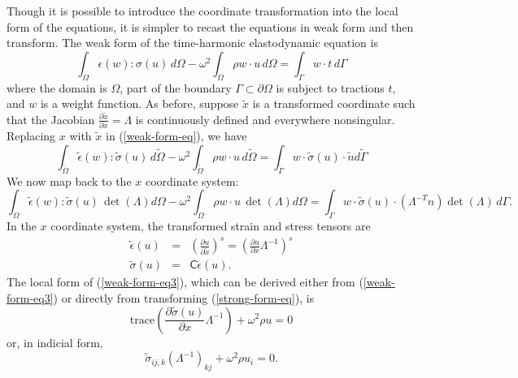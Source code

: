 \documentclass{article}
\newcommand{\trace}{\mathrm{trace}}
\newcommand{\sfC}{\mathsf{C}}
\newcommand{\Lambdaip}{\left( \Lambda^{-1} \right)}
\begin{document}
Though it is possible to introduce the coordinate transformation into
the local form of the equations, it is simpler to recast the equations
in weak form and then transform.  The weak form of the time-harmonic
elastodynamic equation is
\begin{equation}
  \int_\Omega \epsilon(w) : \sigma(u) \, d\Omega -
  \omega^2 \int_\Omega \rho w \cdot u \, d\Omega =
  \int_{\Gamma} w \cdot t \, d\Gamma 
  \label{weak-form-eq}
\end{equation}
where the domain is $\Omega$, part of the boundary $\Gamma \subset
\partial \Omega$ is subject to tractions $t$, and $w$ is a weight
function.  As before, suppose $\tilde{x}$ is a transformed coordinate
such that the Jacobian $\frac{\partial \tilde{x}}{\partial x} =
\Lambda$ is continuously defined and everywhere nonsingular.
Replacing $x$ with $\tilde{x}$ in (\ref{weak-form-eq}), we have
\begin{equation}
  \int_{\tilde{\Omega}}
    \tilde{\epsilon}(w) : \tilde{\sigma}(u) \, d\tilde{\Omega} -
  \omega^2 \int_{\tilde{\Omega}} \rho w \cdot u \, d\tilde{\Omega} =
  \int_{\tilde{\Gamma}} 
    w \cdot \tilde{\sigma}(u) \cdot \tilde{n} d\tilde{\Gamma}
  \label{weak-form-eq2}
\end{equation}
We now map back to the $x$ coordinate system:
\begin{equation}
  \int_{\Omega} 
    \tilde{\epsilon}(w) : \tilde{\sigma}(u) \, \det(\Lambda) d\Omega -
  \omega^2 \int_\Omega \rho w \cdot u \, \det(\Lambda) d\Omega =
  \int_{\Gamma}
    w \cdot \tilde{\sigma}(u) \cdot (\Lambda^{-T} n) \det(\Lambda) \, d\Gamma.
  \label{weak-form-eq3}
\end{equation}
In the $x$ coordinate system, the transformed strain and stress tensors are
\begin{eqnarray}
  \tilde{\epsilon}(u) 
   & = & \left( \frac{\partial u}{\partial \tilde{x}} \right)^s
     =   \left( \frac{\partial u}{\partial x} \Lambda^{-1} \right)^s \\
  \tilde{\sigma}(u)
   & = & \sfC \tilde{\epsilon}(u).
\end{eqnarray}
The local form of (\ref{weak-form-eq3}), which can be derived either
from (\ref{weak-form-eq3}) or directly from transforming 
(\ref{strong-form-eq}), is
\begin{equation}
  \trace\left( \frac{\partial \tilde{\sigma}(u)}{\partial x} 
               \Lambda^{-1} \right) + \omega^2 \rho u = 0
\end{equation}
or, in indicial form,
\begin{equation}
  \tilde{\sigma}_{ij,k} \Lambdaip_{kj} + \omega^2 \rho u_i = 0.
\end{equation}
\end{document}
